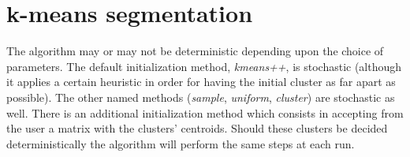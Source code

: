 \section{k-means segmentation}

The algorithm may or may not be deterministic depending upon the choice of
parameters. The default initialization method, \emph{kmeans++}, is
stochastic (although it
applies a certain heuristic in order for having the initial cluster as far
apart as possible). The other named methods (\emph{sample}, \emph{uniform},
\emph{cluster}) are stochastic as well. There is an additional initialization
method which consists in accepting from the user a matrix with the clusters' centroids.
Should these clusters be decided deterministically the algorithm will perform
the same steps at each run.